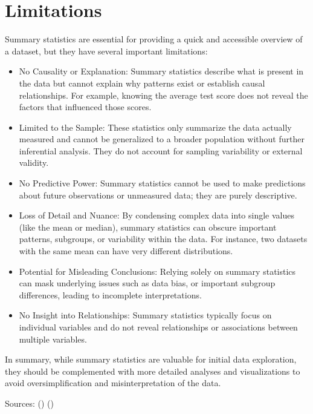 \documentclass[
  man,
  floatsintext,
  longtable,
  nolmodern,
  notxfonts,
  notimes,
  colorlinks=true,linkcolor=blue,citecolor=blue,urlcolor=blue]{apa7}
\begin{document}
\newpage

\section{Limitations}\label{limitations}

Summary statistics are essential for providing a quick and accessible
overview of a dataset, but they have several important limitations:

\begin{itemize}
\item
  No Causality or Explanation: Summary statistics describe what is
  present in the data but cannot explain why patterns exist or establish
  causal relationships. For example, knowing the average test score does
  not reveal the factors that influenced those scores.
\item
  Limited to the Sample: These statistics only summarize the data
  actually measured and cannot be generalized to a broader population
  without further inferential analysis. They do not account for sampling
  variability or external validity.
\item
  No Predictive Power: Summary statistics cannot be used to make
  predictions about future observations or unmeasured data; they are
  purely descriptive.
\item
  Loss of Detail and Nuance: By condensing complex data into single
  values (like the mean or median), summary statistics can obscure
  important patterns, subgroups, or variability within the data. For
  instance, two datasets with the same mean can have very different
  distributions.
\item
  Potential for Misleading Conclusions: Relying solely on summary
  statistics can mask underlying issues such as data bias, or important
  subgroup differences, leading to incomplete interpretations.
\item
  No Insight into Relationships: Summary statistics typically focus on
  individual variables and do not reveal relationships or associations
  between multiple variables.
\end{itemize}

In summary, while summary statistics are valuable for initial data
exploration, they should be complemented with more detailed analyses and
visualizations to avoid oversimplification and misinterpretation of the
data.

Sources: ()
()
\end{document}
